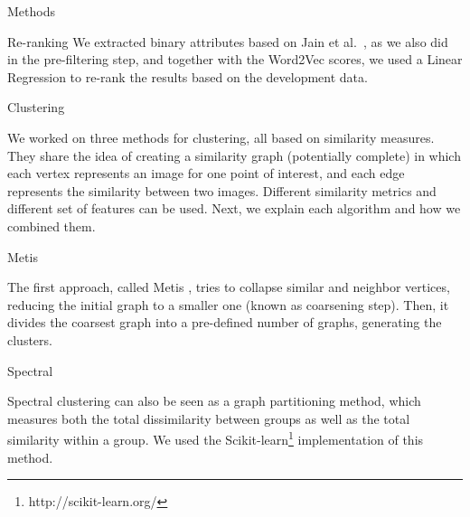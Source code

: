 \documentclass{acm_proc_article-me}
\begin{document}
\begin{section}{Methods}
\begin{subsection}{Re-ranking}
We extracted binary attributes based on Jain et al.~\cite{wsp13}, as we also did in the pre-filtering step, and together with the Word2Vec scores, we used a Linear Regression to re-rank the results based on the development data.



\end{subsection}


\begin{subsection}{Clustering}

We worked on three methods for clustering, all based on similarity measures.
They share the idea of creating a similarity graph (potentially complete) in which each vertex represents an image for one point of interest, and
each edge represents the similarity between two images. Different similarity metrics and different set of features can be used.
Next, we explain each algorithm and how we combined them.


\begin{subsubsection}{Metis}

The first approach, called Metis \cite{metis},
tries to collapse similar and neighbor vertices, reducing the initial graph to a smaller one (known as coarsening step).
Then, it divides the coarsest graph into a pre-defined number of graphs, generating the clusters.  

\end{subsubsection}

\begin{subsubsection}{Spectral}

Spectral clustering \cite{spectral} can also be seen as a graph partitioning method, which measures both the total dissimilarity between groups 
as well as the total similarity within a group. We used the 
Scikit-learn\footnote{http://scikit-learn.org/} 
implementation of this method. 



\end{subsubsection}
\end{subsection}
\end{section}
\end{document}
